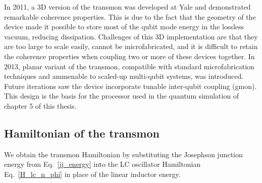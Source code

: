 In 2011, a 3D version of the transmon was developed at Yale and demonstrated remarkable coherence properties.\cite{Paik2011}
This is due to the fact that the geometry of the device made it possible to store most of the qubit mode energy in the lossless vacuum, reducing dissipation.
Challenges of this 3D implementation are that they are too large to scale easily, cannot be microfabricated,
and it is difficult to retain the coherence properties when coupling two or more of these devices together.
In 2013, planar variant of the transmon,
compatible with standard microfabrication techniques and ammenable to scaled-up multi-qubit systems, was introduced.\cite{Barends2013}
Future iterations saw the device incorporate tunable inter-qubit coupling (gmon).\cite{Chen2014}
This design is the basis for the processor used in the quantum simulation of chapter 5 of this thesis.


\subsection{Hamiltonian of the transmon}

We obtain the transmon Hamiltonian by substituting the Josephson junction energy from Eq.~\ref{jj_energy} into the LC oscillator Hamiltonian
Eq.~\ref{H_lc_n_phi} in place of the linear inductor energy.

